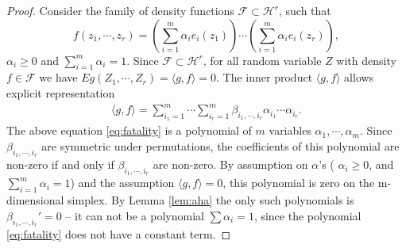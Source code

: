 \documentclass{article}
\newtheorem{definition}{Definition}
\newtheorem{lemma}{Lemma}
\begin{document}
\begin{proof}
Consider the family of density functions  $\mathcal F \subset \mathcal H^r$, such that  
\[
f(z_1,\cdots,z_r)= (\sum_{i=1}^{m} \alpha_i e_i(z_1)) \cdots (\sum_{i=1}^{m} \alpha_i e_i(z_r)),
\]
$\alpha_i \geq 0$ and $\sum_{i=1}^m \alpha_i=1$. Since $\mathcal F \subset \mathcal H^r$, for all random variable $Z$ with density  $f \in \mathcal{F}$ we have $E g(Z_1,\cdots ,Z_r) = \langle g, f \rangle =0$. The inner product $\langle g, f \rangle$ allows explicit representation  
\begin{align}
\label{eq:fatality}
\langle g, f \rangle = \sum_{i_1=1}^{m} \cdots  \sum_{i_r=1}^{m} \beta_{i_1,\cdots, i_r} \alpha_{i_1} \cdots \alpha_{i_r}.
\end{align}
The above equation \eqref{eq:fatality} is a polynomial of $m$ variables $\alpha_{1},\cdots,\alpha_{m}$. Since $\beta_{i_1,\cdots, i_r}$ are symmetric under permutations, the coefficients of this polynomial are non-zero if and only if $\beta_{i_1,\cdots, i_r}$ are non-zero. By assumption on $\alpha$'s ( $\alpha_i \geq 0$, and $\sum_{i=1}^m \alpha_i=1$) and the assumption $\langle g, f \rangle =0$, this polynomial is zero on the m-dimensional simplex. By Lemma \ref{lem:aha} the only such polynomials is $\beta_{i_1, \cdots ,i_r}'=0$ -- it can not be a polynomial $\sum \alpha_i=1$, since the polynomial \eqref{eq:fatality} does not have a constant term. 
\end{proof}



% 

% 
\end{document}

